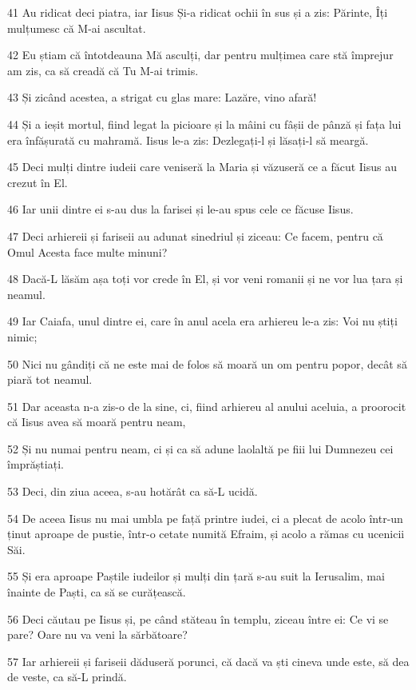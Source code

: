 \par 41 Au ridicat deci piatra, iar Iisus Și-a ridicat ochii în sus și a zis: Părinte, Îți mulțumesc că M-ai ascultat.
\par 42 Eu știam că întotdeauna Mă asculți, dar pentru mulțimea care stă împrejur am zis, ca să creadă că Tu M-ai trimis.
\par 43 Și zicând acestea, a strigat cu glas mare: Lazăre, vino afară!
\par 44 Și a ieșit mortul, fiind legat la picioare și la mâini cu fâșii de pânză și fața lui era înfășurată cu mahramă. Iisus le-a zis: Dezlegați-l și lăsați-l să meargă.
\par 45 Deci mulți dintre iudeii care veniseră la Maria și văzuseră ce a făcut Iisus au crezut în El.
\par 46 Iar unii dintre ei s-au dus la farisei și le-au spus cele ce făcuse Iisus.
\par 47 Deci arhiereii și fariseii au adunat sinedriul și ziceau: Ce facem, pentru că Omul Acesta face multe minuni?
\par 48 Dacă-L lăsăm așa toți vor crede în El, și vor veni romanii și ne vor lua țara și neamul.
\par 49 Iar Caiafa, unul dintre ei, care în anul acela era arhiereu le-a zis: Voi nu știți nimic;
\par 50 Nici nu gândiți că ne este mai de folos să moară un om pentru popor, decât să piară tot neamul.
\par 51 Dar aceasta n-a zis-o de la sine, ci, fiind arhiereu al anului aceluia, a proorocit că Iisus avea să moară pentru neam,
\par 52 Și nu numai pentru neam, ci și ca să adune laolaltă pe fiii lui Dumnezeu cei împrăștiați.
\par 53 Deci, din ziua aceea, s-au hotărât ca să-L ucidă.
\par 54 De aceea Iisus nu mai umbla pe față printre iudei, ci a plecat de acolo într-un ținut aproape de pustie, într-o cetate numită Efraim, și acolo a rămas cu ucenicii Săi.
\par 55 Și era aproape Paștile iudeilor și mulți din țară s-au suit la Ierusalim, mai înainte de Paști, ca să se curățească.
\par 56 Deci căutau pe Iisus și, pe când stăteau în templu, ziceau între ei: Ce vi se pare? Oare nu va veni la sărbătoare?
\par 57 Iar arhiereii și fariseii dăduseră porunci, că dacă va ști cineva unde este, să dea de veste, ca să-L prindă.

